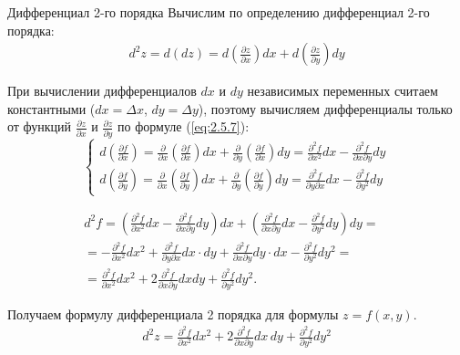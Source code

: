 \begin{tbox}{Дифференциал 2-го порядка}
	Вычислим по определению дифференциал 2-го порядка:
	\begin{align} \label{eq:2.5.10*}
		d^2 z = d(dz) = d \left( \frac{\partial z}{\partial x}\right) dx + d\left(\frac{\partial z}{\partial y}\right) dy
	\end{align}

	При вычислении дифференциалов $dx$ и $dy$ независимых переменных считаем константными ($dx = \Delta x$, $dy = \Delta y$), поэтому вычисляем дифференциалы только от функций $\frac{\partial z}{\partial x}$ и $\frac{\partial z}{\partial y}$ по формуле (\ref{eq:2.5.7}):
	\begin{equation}
		\begin{cases}
			\displaystyle d \left( \frac{\partial f}{\partial x} \right) = \frac{\partial}{\partial x} \left( \frac{\partial f}{\partial x} \right) dx + \frac{\partial}{\partial y} \left( \frac{\partial f}{\partial x} \right) dy
			= \frac{\partial^2 f}{\partial x^2} dx - \frac{\partial^2 f}{\partial x \partial y} dy\\
			\displaystyle d \left( \frac{\partial f}{\partial y} \right) = \frac{\partial}{\partial x} \left( \frac{\partial f}{\partial y} \right) dx + \frac{\partial}{\partial y} \left( \frac{\partial f}{\partial y} \right) dy = \frac{\partial^2 f}{\partial y \partial x} dx - \frac{\partial^2 f}{\partial y^2} dy
		\end{cases}
	\end{equation}

	\begin{align*}
		d^2 f = \left( \frac{\partial^2 f}{\partial x^2} dx - \frac{\partial^2 f}{\partial x \partial y} dy \right) dx
		+ \left( \frac{\partial^2 f}{\partial x \partial y} dx - \frac{\partial^2 f}{\partial y^2} dy \right) dy = &\\
		= -\frac{\partial^2 f}{\partial x^2} dx^2 + \frac{\partial^2 f}{\partial y \partial x} dx \cdot dy + \frac{\partial^2 f}{\partial x \partial y} dy \cdot dx - \frac{\partial^2 f}{\partial y^2} dy^2 = &\\
		= \frac{\partial^2 f}{\partial x^2} dx^2 + 2\frac{\partial^2 f}{\partial x \partial y} dx dy + \frac{\partial^2 f}{\partial y^2} dy^2.&
	\end{align*}

	Получаем формулу дифференциала 2 порядка для формулы $z = f(x, y)$.
	\begin{align} \label{eq:2.5.11}
		d^2 z = \frac{\partial^2 f}{\partial x^2} d x^2 + 2 \frac{\partial^2 f}{\partial x \partial y} d x \, d y + \frac{\partial^2 f}{\partial y^2} d y^2
	\end{align}
\end{tbox}

